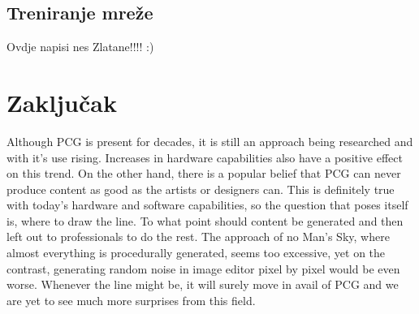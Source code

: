 \documentclass[journal]{IEEEtran}
\begin{document}
\subsection{Treniranje mreže}
Ovdje napisi nes Zlatane!!!! :)



\section{Zaključak}
Although PCG is present for decades, it is still an approach being researched and with it's use rising. Increases in hardware capabilities also have a positive effect on this trend. On the other hand, there is a popular belief that PCG can never produce content as good as the artists or designers can. This is definitely true with today's hardware and software capabilities, so the question that poses itself is, where to draw the line. To what point should content be generated and then left out to professionals to do the rest. The approach of no Man's Sky, where almost everything is procedurally generated, seems too excessive, yet on the contrast, generating random noise in image editor pixel by pixel would be even worse. Whenever the line might be, it will surely move in avail of PCG and we are yet to see much more surprises from this field.

\ifCLASSOPTIONcaptionsoff
  \newpage
\fi



\end{document}

